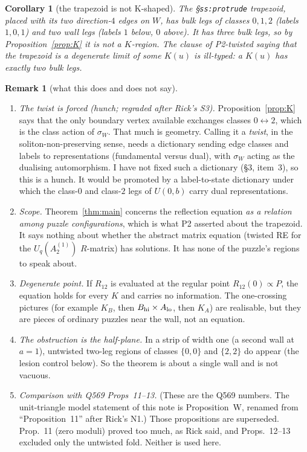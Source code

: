 \documentclass[11pt]{article}
\newtheorem{corollary}[theorem]{Corollary}
\theoremstyle{definition}
\newtheorem{remark}[theorem]{Remark}
\begin{document}
\begin{corollary}[the trapezoid is not K-shaped]\label{cor:trap}
The \S\texttt{ss:protrude} trapezoid, placed with its two direction-$4$ edges on $W$, has bulk legs of
classes $0,1,2$ (labels $1,0,1$) and two wall legs (labels $1$ below, $0$ above). It has three bulk
legs, so by Proposition~\ref{prop:K} it is not a $K$-region. The clause of P2-twisted saying that
the trapezoid is a degenerate limit of some $K(u)$ is ill-typed: a $K(u)$ has exactly two bulk legs.
\end{corollary}

\begin{remark}[what this does and does not say]
\begin{enumerate}
\item \emph{The twist is forced (hunch; regraded after Rick's S3).} Proposition~\ref{prop:K} says that the only boundary vertex
available exchanges classes $0\leftrightarrow2$, which is the class action of $\sigma_W$. That much is
geometry. Calling it a \emph{twist}, in the soliton-non-preserving sense, needs a dictionary sending edge
classes and labels to representations (fundamental versus dual), with $\sigma_W$ acting as the
dualising automorphism. I have not fixed such a dictionary (\S3, item~3), so this is a hunch. It would be
promoted by a label-to-state dictionary under which the class-$0$ and class-$2$ legs of $U(0,b)$ carry
dual representations.
\item \emph{Scope.} Theorem~\ref{thm:main} concerns the reflection equation \emph{as a relation
among puzzle configurations}, which is what P2 asserted about the trapezoid. It says nothing about
whether the abstract matrix equation (twisted RE for the $U_q(A_2^{(1)})$ $R$-matrix) has solutions.
It has none of the puzzle's regions to speak about.
\item \emph{Degenerate point.} If $R_{12}$ is evaluated at the regular point $R_{12}(0)\propto P$,
the equation holds for every $K$ and carries no information. The one-crossing pictures
(for example $K_B$, then $B_{\rm hi}\times A_{\rm lo}$, then $K_A$) are realisable, but they are
pieces of ordinary puzzles near the wall, not an equation.
\item \emph{The obstruction is the half-plane.} In a strip of width one (a second wall at $a=1$),
untwisted two-leg regions of classes $\{0,0\}$ and $\{2,2\}$ do appear (the lesion control below).
So the theorem is about a single wall and is not vacuous.
\item \emph{Comparison with Q569 Props~11--13.} (These are the Q569 numbers. The unit-triangle model
statement of this note is Proposition~W, renamed from ``Proposition~11'' after Rick's N1.) Those propositions are superseded. Prop.~11 (zero
moduli) proved too much, as Rick said, and Props.~12--13 excluded only the untwisted fold. Neither
is used here.
\end{enumerate}
\end{remark}
\end{document}
